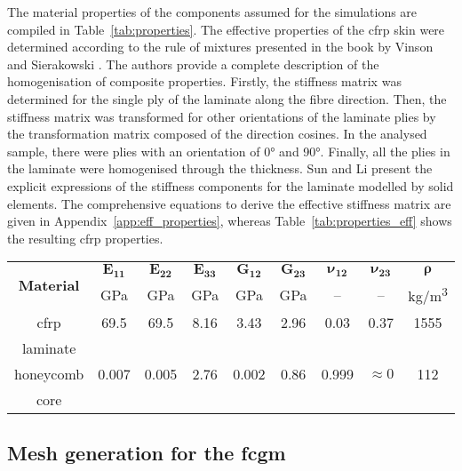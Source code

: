 \documentclass[a4paper,fleqn]{cas-dc}
\begin{document}
The material properties of the components assumed for the simulations are compiled in Table~\ref{tab:properties}.
The effective properties of the \ac{cfrp} skin were determined according to the rule of mixtures presented in the book by Vinson and Sierakowski \cite{vinson1993behavior}.
The authors provide a complete description of the homogenisation of composite properties.
Firstly, the stiffness matrix was determined for the single ply of the laminate along the fibre direction.
Then, the stiffness matrix was transformed for other orientations of the laminate plies by the transformation matrix composed of the direction cosines.
In the analysed sample, there were plies with an orientation of \ang{0} and \ang{90}.
Finally, all the plies in the laminate were homogenised through the thickness.
Sun and Li \cite{sun1988three} present the explicit expressions of the stiffness components for the laminate modelled by solid elements.
The comprehensive equations to derive the effective stiffness matrix are given in Appendix~\ref{app:eff_properties}, whereas Table~\ref{tab:properties_eff} shows the resulting \ac{cfrp} properties.
\begin{table*}
	\centering
	\small
	\tabcolsep=0.25cm
	\caption{\label{tab:properties_eff} The homogenised mechanical properties of the \acs{cfrp} plate and the honeycomb core for +20\unit{\degreeCelsius}}
	\begin{tabular}{ccccccccc}
		\toprule
		\multirow{2}{*}{\textbf{Material}} & \(\boldsymbol{E_{11}}\) & \(\boldsymbol{E_{22}}\) & \(\boldsymbol{E_{33}}\) & \(\boldsymbol{G_{12}}\) & \(\boldsymbol{G_{23}}\) & \(\boldsymbol{\nu_{12}}\)	& \(\boldsymbol{\nu_{23}}\) & \(\boldsymbol{\rho}\) \\
		& \unit{\giga\pascal} & \unit{\giga\pascal} & \unit{\giga\pascal} & \unit{\giga\pascal} & \unit{\giga\pascal} & -- & -- & \unit[per-mode = symbol]
		{\kilogram\per\cubic\metre}\\
		\midrule
		\ac{cfrp} & 69.5 & 69.5 & 8.16 & 3.43 & 2.96 & 0.03 & 0.37 & 1555\\
		laminate & & & & & & & &\\
		\midrule
		honeycomb & 0.007 & 0.005 & 2.76 & 0.002 & 0.86 & 0.999 & \(\approx0\) & 112\\
		core & & & & & & & &\\
		\bottomrule
	\end{tabular}
\end{table*}

\subsection{Mesh generation for the \acl{fcgm}}
\label{sec:honeycomb}
\end{document}
